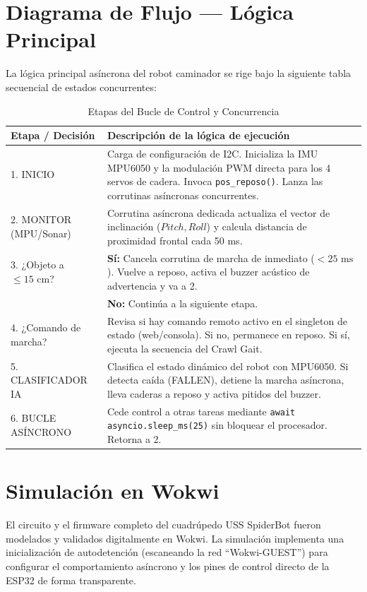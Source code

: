 \documentclass[12pt]{article}
\newcommand{\codigo}[1]{\texttt{#1}}
\begin{document}
\section{Diagrama de Flujo — Lógica Principal}
La lógica principal asíncrona del robot caminador se rige bajo la siguiente tabla secuencial de estados concurrentes:

\begin{table}[htbp]
\centering
\caption{Etapas del Bucle de Control y Concurrencia}
\vspace{0.3cm}
\begin{tabularx}{\textwidth}{l X}
\toprule
\textbf{Etapa / Decisión} & \textbf{Descripción de la lógica de ejecución} \\
\midrule
1. INICIO & Carga de configuración de I2C. Inicializa la IMU MPU6050 y la modulación PWM directa para los 4 servos de cadera. Invoca \codigo{pos\_reposo()}. Lanza las corrutinas asíncronas concurrentes. \\
2. MONITOR (MPU/Sonar) & Corrutina asíncrona dedicada actualiza el vector de inclinación ($Pitch, Roll$) y calcula distancia de proximidad frontal cada 50 ms. \\
3. ¿Objeto a $\le 15\text{ cm}$? & \textbf{Sí:} Cancela corrutina de marcha de inmediato ($<25\text{ ms}$). Vuelve a reposo, activa el buzzer acústico de advertencia y va a 2. \\
& \textbf{No:} Continúa a la siguiente etapa. \\
4. ¿Comando de marcha? & Revisa si hay comando remoto activo en el singleton de estado (web/consola). Si no, permanece en reposo. Si sí, ejecuta la secuencia del Crawl Gait. \\
5. CLASIFICADOR IA & Clasifica el estado dinámico del robot con MPU6050. Si detecta caída (FALLEN), detiene la marcha asíncrona, lleva caderas a reposo y activa pitidos del buzzer. \\
6. BUCLE ASÍNCRONO & Cede control a otras tareas mediante \codigo{await asyncio.sleep\_ms(25)} sin bloquear el procesador. Retorna a 2. \\
\bottomrule
\end{tabularx}
\end{table}

\newpage

\section{Simulación en Wokwi}
El circuito y el firmware completo del cuadrúpedo USS SpiderBot fueron modelados y validados digitalmente en Wokwi. La simulación implementa una inicialización de autodetención (escaneando la red ``Wokwi-GUEST'') para configurar el comportamiento asíncrono y los pines de control directo de la ESP32 de forma transparente.
\end{document}
